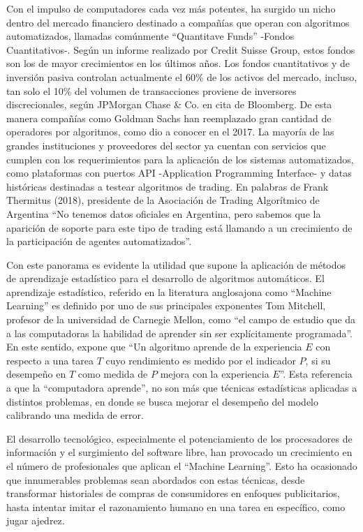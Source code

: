 \documentclass[a4paper,12pt]{Latex/Classes/PhDthesisPSnPDF}
\begin{document}
Con el impulso de computadores cada vez más potentes, ha surgido un nicho dentro del mercado financiero destinado a compañías que operan con algoritmos automatizados, llamadas comúnmente “Quantitave Funds” -Fondos Cuantitativos-. Según un informe realizado por Credit Suisse Group, estos fondos son los de mayor crecimientos en los últimos años. Los fondos cuantitativos y de inversión pasiva controlan actualmente el 60\% de los activos del mercado, incluso, tan solo el 10\% del volumen de transacciones proviene de inversores discrecionales, según JPMorgan Chase \& Co. en cita de Bloomberg. De esta manera compañías como Goldman Sachs han reemplazado gran cantidad de operadores por algoritmos, como dio a conocer en el 2017. La mayoría de las grandes instituciones y proveedores del sector ya cuentan con servicios que cumplen con los requerimientos para la aplicación de los sistemas automatizados, como plataformas con puertos API -Application Programming Interface- y datas históricas destinadas a testear algoritmos de trading. En palabras de Frank Thermitus (2018), presidente de la Asociación de Trading Algorítmico de Argentina “No tenemos datos oficiales en Argentina, pero sabemos que la aparición de soporte para este tipo de trading está llamando a un crecimiento de la participación de agentes automatizados”.

Con este panorama es evidente la utilidad que supone la aplicación de métodos de aprendizaje estadístico para el desarrollo de algoritmos automáticos. El aprendizaje estadístico, referido en la literatura anglosajona como “Machine Learning” es definido por uno de sus principales exponentes Tom Mitchell, profesor de la universidad de Carnegie Mellon, como “el campo de estudio que da a las computadoras la habilidad de aprender sin ser explícitamente programada”. En este sentido, expone que “Un algoritmo aprende de la experiencia $E$ con respecto a una tarea $T$ cuyo rendimiento es medido por el indicador $P$, si su desempeño en $T$ como medida de $P$ mejora con la experiencia $E$”. Esta referencia a que la “computadora aprende”, no son más que técnicas estadísticas aplicadas a distintos problemas, en donde se busca mejorar el desempeño del modelo calibrando una medida de error.

El desarrollo tecnológico, especialmente el potenciamiento de los procesadores de información y el surgimiento del software libre, han provocado un crecimiento en el número de profesionales que aplican el “Machine Learning”. Esto ha ocasionado que innumerables problemas sean abordados con estas técnicas, desde transformar historiales de compras de consumidores en enfoques publicitarios, hasta intentar imitar el razonamiento humano en una tarea en específico, como jugar ajedrez.
\end{document}
